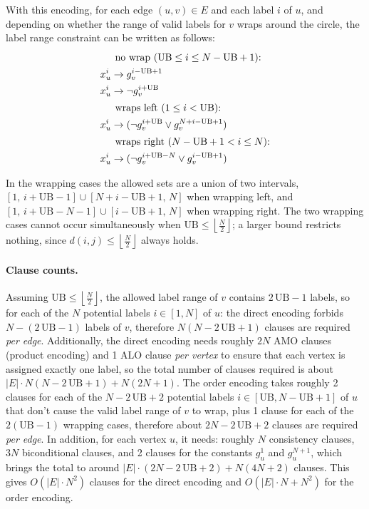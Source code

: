 \documentclass[a4paper,fleqn]{cas-sc}
\begin{document}
            \vspace{1em}

            With this encoding, for each edge $(u,v)\in E$ and each label $i$ of $u$, and depending on whether the range of valid labels for $v$ wraps around the circle, the label range constraint can be written as follows:
            \begin{align}
                \intertext{\hspace*{\parindent}no wrap $(\text{UB} \le i \le N-\text{UB}+1)$:}
                x_u^i &\rightarrow g_v^{i-\text{UB}+1} \\
                x_u^i &\rightarrow \neg g_v^{i+\text{UB}} \\
                \intertext{\hspace*{\parindent}wraps left $(1 \leq i < \text{UB})$:}
                x_u^i &\rightarrow (\neg g_v^{i+\text{UB}} \vee g_v^{N+i-\text{UB}+1}) \\
                \intertext{\hspace*{\parindent}wraps right $(N-\text{UB}+1 < i \leq N)$:}
                x_u^i &\rightarrow (\neg g_v^{i+\text{UB}-N} \vee g_v^{i-\text{UB}+1})
            \end{align}

            In the wrapping cases the allowed sets are a union of two intervals, $[1,\,i+\text{UB}-1] \cup [N+i-\text{UB}+1,\,N]$ when wrapping left, and $[1,\,i+\text{UB}-N-1] \cup [i-\text{UB}+1,\,N]$ when wrapping right. The two wrapping cases cannot occur simultaneously when $\text{UB} \le \left\lfloor \frac{N}{2} \right\rfloor$; a larger bound restricts nothing, since $d(i,j) \le \left\lfloor \frac{N}{2} \right\rfloor$ always holds.

        \paragraph{\textbf{Clause counts.}}
            Assuming $\text{UB} \le \left\lfloor \frac{N}{2} \right\rfloor$, the allowed label range of $v$ contains $2\,\text{UB}-1$ labels, so for each of the $N$ potential labels $i\in [1,N]$ of $u$: the direct encoding forbids $N-(2\,\text{UB}-1)$ labels of $v$, therefore $N(N-2\,\text{UB}+1)$ clauses are required \textit{per edge}. Additionally, the direct encoding needs roughly $2N$ $\text{AMO}$ clauses (product encoding) and 1 $\text{ALO}$ clause \textit{per vertex} to ensure that each vertex is assigned exactly one label, so the total number of clauses required is about $|E|\cdot N(N-2\,\text{UB}+1) + N(2N+1)$. The order encoding takes roughly 2 clauses for each of the $N-2\,\text{UB}+2$ potential labels $i\in [\text{UB},N-\text{UB}+1]$ of $u$ that don't cause the valid label range of $v$ to wrap, plus 1 clause for each of the $2(\text{UB}-1)$ wrapping cases, therefore about $2N-2\,\text{UB}+2$ clauses are required \textit{per edge}. In addition, for each vertex $u$, it needs: roughly $N$ consistency clauses, $3N$ biconditional clauses, and 2 clauses for the constants $g_u^1$ and $g_u^{N+1}$, which brings the total to around $|E|\cdot (2N-2\,\text{UB}+2) + N(4N+2)$ clauses. This gives $O(|E|\cdot N^2)$ clauses for the direct encoding and $O(|E|\cdot N + N^2)$ for the order encoding.
\end{document}
